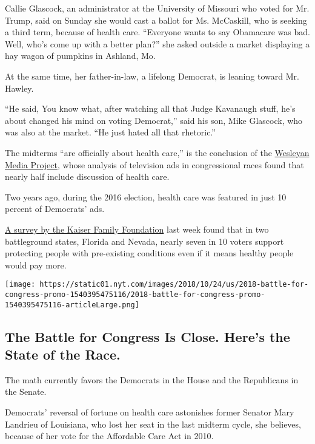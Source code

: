 Callie Glascock, an administrator at the University of Missouri who
voted for Mr. Trump, said on Sunday she would cast a ballot for Ms.
McCaskill, who is seeking a third term, because of health care.
``Everyone wants to say Obamacare was bad. Well, who's come up with a
better plan?'' she asked outside a market displaying a hay wagon of
pumpkins in Ashland, Mo.

At the same time, her father-in-law, a lifelong Democrat, is leaning
toward Mr. Hawley.

``He said, You know what, after watching all that Judge Kavanaugh stuff,
he's about changed his mind on voting Democrat,'' said his son, Mike
Glascock, who was also at the market. ``He just hated all that
rhetoric.''

The midterms ``are officially about health care,'' is the conclusion of
the \href{http://mediaproject.wesleyan.edu/releases/101818-tv/}{Wesleyan
Media Project}, whose analysis of television ads in congressional races
found that nearly half include discussion of health care.

Two years ago, during the 2016 election, health care was featured in
just 10 percent of Democrats' ads.

\href{https://www.kff.org/health-reform/press-release/poll-midterms-health-care-voters-top-issue-but-president-trump-and-other-factors-also-loom-large/}{A
survey by the Kaiser Family Foundation} last week found that in two
battleground states, Florida and Nevada, nearly seven in 10 voters
support protecting people with pre-existing conditions even if it means
healthy people would pay more.

\href{https://www.nytimes.com/interactive/2018/10/24/us/elections/2018-battle-for-congress.html}{}

\texttt{[image: https://static01.nyt.com/images/2018/10/24/us/2018-battle-for-congress-promo-1540395475116/2018-battle-for-congress-promo-1540395475116-articleLarge.png]}

\hypertarget{the-battle-for-congress-is-close-heres-the-state-of-the-race}{%
\subsection{The Battle for Congress Is Close. Here's the State of the
Race.}\label{the-battle-for-congress-is-close-heres-the-state-of-the-race}}

The math currently favors the Democrats in the House and the Republicans
in the Senate.

Democrats' reversal of fortune on health care astonishes former Senator
Mary Landrieu of Louisiana, who lost her seat in the last midterm cycle,
she believes, because of her vote for the Affordable Care Act in 2010.

